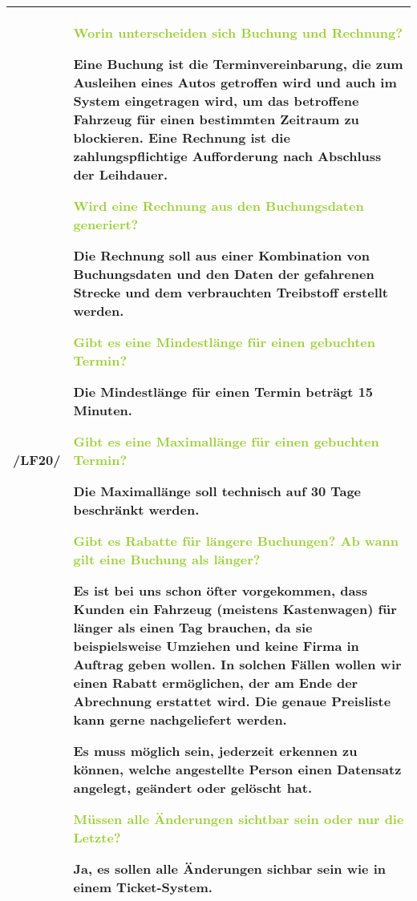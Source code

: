 \begin{tabular}{l | p{13cm}}
    \hline
    /LF20/ & \textcolor{YellowGreen}{Worin unterscheiden sich Buchung und Rechnung?}

    \textcolor{NavyBlue}{Eine Buchung ist die Terminvereinbarung, die zum Ausleihen eines Autos getroffen wird und auch im System eingetragen wird, um das betroffene Fahrzeug für einen bestimmten Zeitraum zu blockieren. Eine Rechnung ist die zahlungspflichtige Aufforderung nach Abschluss der Leihdauer.}

    \textcolor{YellowGreen}{Wird eine Rechnung aus den Buchungsdaten generiert?}

    \textcolor{NavyBlue}{Die Rechnung soll aus einer Kombination von Buchungsdaten und den Daten der gefahrenen Strecke und dem verbrauchten Treibstoff erstellt werden.}

    \textcolor{YellowGreen}{Gibt es eine Mindestlänge für einen gebuchten Termin?}

    \textcolor{NavyBlue}{Die Mindestlänge für einen Termin beträgt 15 Minuten.}

    \textcolor{YellowGreen}{Gibt es eine Maximallänge für einen gebuchten Termin?}

    \textcolor{NavyBlue}{Die Maximallänge soll technisch auf 30 Tage beschränkt werden.}

    \textcolor{YellowGreen}{Gibt es Rabatte für längere Buchungen? Ab wann gilt eine Buchung als länger?}

    \textcolor{NavyBlue}{Es ist bei uns schon öfter vorgekommen, dass Kunden ein Fahrzeug (meistens Kastenwagen) für länger als einen Tag brauchen, da sie beispielsweise Umziehen und keine Firma in Auftrag geben wollen. In solchen Fällen wollen wir einen Rabatt ermöglichen, der am Ende der Abrechnung erstattet wird. Die genaue Preisliste kann gerne nachgeliefert werden.}

    Es muss möglich sein, jederzeit erkennen zu können, welche angestellte Person einen Datensatz angelegt, geändert oder gelöscht hat. 
    
    \textcolor{YellowGreen}{Müssen alle Änderungen sichtbar sein oder nur die Letzte?}

    \textcolor{NavyBlue}{Ja, es sollen alle Änderungen sichbar sein wie in einem Ticket-System.}
    \\
    \hline
\end{tabular}

